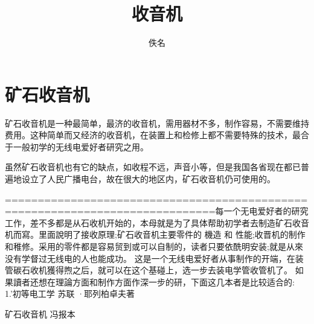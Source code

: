 \documentclass[12pt,UTF8]{ctexbook}
\title{\heiti\zihao{0} 收音机}
\author{佚名}
\date{}
\begin{document}
\maketitle
\tableofcontents

\frontmatter

\mainmatter

\chapter{矿石收音机}

矿石收音机是一种最简单，最济的收音机，需用器材不多，制作容易，不需要维持费用。这种简单而又经济的收音机，在装置上和检修上都不需要特殊的技术，最合于一般初学的无线电爱好者研究之用。

虽然矿石收音机也有它的缺点，如收程不远，声音小等，但是我国各省现在都已普遍地设立了人民广播电台，故在很大的地区内，矿石收音机仍可使用的。

==============================================================================每一个无电爱好者的研究工作，差不多都是从石收机开始的，本母就是为了具体帮助初学者去制造矿石收音机而寫。里面說明了接收原理;矿石收音机主要零件的 機造 和 性能;收晋机的制作和稚修。采用的零件都是容易贸到或可以自制的，读者只要依酰明安装;就是从來没有学督过无线电的人也能成功。
这是一个无线电爱好者从事制作的开端，在装管碳石收机獲得煦之后，就可以在这个基碰上，选一步去装电学管收管机了。
如果讀者还想在理論方面和制作方面作深一步的研，下面这几本者是比较适合的:
1.'初等电工学
苏联 ·耶列柏卓夫著

\backmatter

矿石收音机 冯报本
\end{document}
